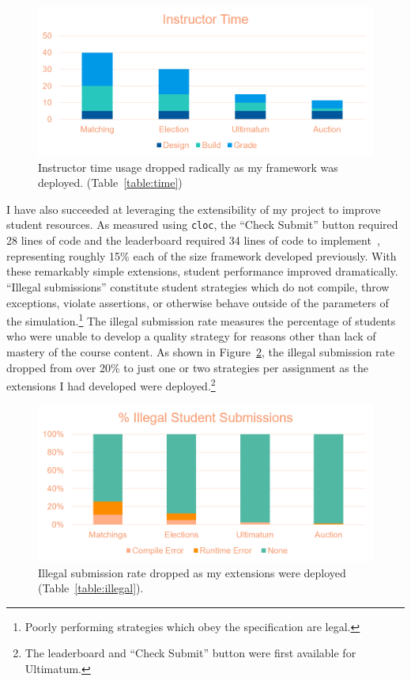 \documentclass[pageno]{jpaper}
\begin{document}
\begin{figure}[hbt]
  \centering
  \includegraphics[width=0.75\linewidth]{instructortime.png}
  \caption{Instructor time usage dropped radically as my framework was deployed. (Table~\ref{table:time})}\label{fig:instructortime}
\end{figure}

I have also succeeded at leveraging the extensibility of my project to improve student resources.
As measured using \texttt{cloc}, the ``Check Submit'' button required 28 lines of code and the leaderboard required 34 lines of code to implement~\cite{s18}, representing roughly 15\% each of the size framework developed previously.
With these remarkably simple extensions, student performance improved dramatically.
``Illegal submissions'' constitute student strategies which do not compile, throw exceptions, violate assertions, or otherwise behave outside of the parameters of the simulation.\footnote{Poorly performing strategies which obey the specification are legal.}
The illegal submission rate measures the percentage of students who were unable to develop a quality strategy for reasons other than lack of mastery of the course content.
As shown in Figure~\ref{fig:illegal}, the illegal submission rate dropped from over 20\% to just one or two strategies per assignment as the extensions I had developed were deployed.\footnote{The leaderboard and ``Check Submit'' button were first available for Ultimatum.}

\begin{figure}[hbt]
  \centering
  \includegraphics[width=0.75\linewidth]{illegal.png}
  \caption{Illegal submission rate dropped as my extensions were deployed (Table~\ref{table:illegal}).}\label{fig:illegal}
\end{figure}
\end{document}
